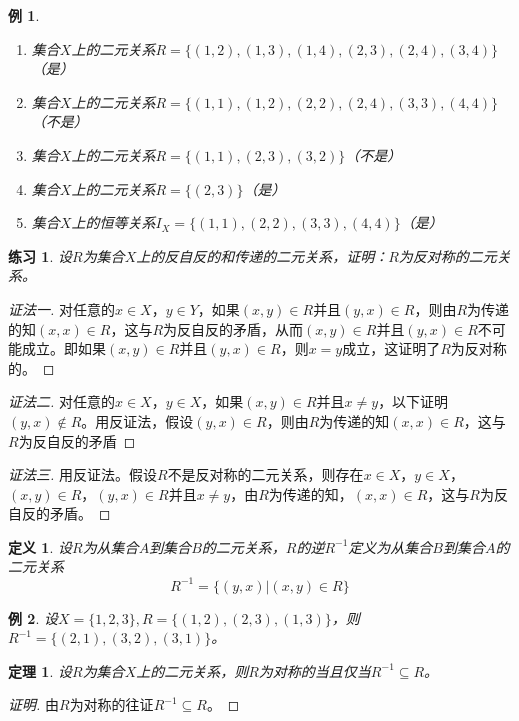 \documentclass{book}[oneside]
\newtheorem{Def}{定义}[chapter]
\newtheorem{Thm}{定理}[chapter]
\newtheorem{Exercise}{练习}[chapter]
\newtheorem{Example}{例}[chapter]
\begin{document}
\begin{CJK*}{UTF8}{gbsn}
\begin{Example}
  \begin{enumerate}
  \item 集合$X$上的二元关系$R=\{(1,2), (1,3), (1,4), (2,3),
    (2,4), (3,4)\}$（是）
  \item 集合$X$上的二元关系$R=\{(1,1), (1,2), (2,2),
    (2,4), (3,3), (4,4)\}$（不是）
  \item 集合$X$上的二元关系$R = \{(1,1), (2,3), (3,2)\}$（不是）
  \item 集合$X$上的二元关系$R = \{(2,3)\}$（是）
  \item 集合$X$上的恒等关系$I_X = \{(1,1), (2,2), (3,3),(4,4)\}$（是）
  \end{enumerate}
\end{Example}
\begin{Exercise}
  设$R$为集合$X$上的反自反的和传递的二元关系，证明：$R$为反对称的二元关系。  
  \end{Exercise}
  \begin{proof}[证法一]对任意的$x\in X$，$y\in Y$，如果$(x,y)\in R$并且$(y,x)\in R$，则由$R$为传递的知$(x,x)\in R$，这与$R$为反自反的矛盾，从而$(x,y)\in R$并且$(y,x)\in R$不可能成立。即如果$(x,y)\in R$并且$(y,x)\in R$，则$x=y$成立，这证明了$R$为反对称的。
    
  \end{proof}
  \begin{proof}[证法二]
   对任意的$x\in X$，$y\in X$，如果$(x,y)\in R$并且$x\neq y$，以下证明$(y,x)\notin R$。用反证法，假设$(y,x)\in R$，则由$R$为传递的知$(x,x)\in R$，这与$R$为反自反的矛盾 
  \end{proof}
  \begin{proof}[证法三]
    用反证法。假设$R$不是反对称的二元关系，则存在$x\in X$，$y\in X$，$(x,y)\in R$，$(y,x)\in R$并且$x\neq y$，由$R$为传递的知，$(x,x)\in R$，这与$R$为反自反的矛盾。
  \end{proof}

\begin{Def}
    设$R$为从集合$A$到集合$B$的二元关系，$R$的逆$R^{-1}$定义为从集合$B$到集合$A$的二元关系
    \[R^{-1}=\{(y,x)|(x,y)\in R\}\]
  \end{Def}
  \begin{Example}
    设$X=\{1,2,3\}, R=\{(1,2),(2,3),(1,3)\}$，则$R^{-1}=\{(2,1),(3,2),(3,1)\}$。
  \end{Example}

  \begin{Thm}
    设$R$为集合$X$上的二元关系，则$R$为对称的当且仅当$R^{-1}\subseteq R$。
  \end{Thm} 
\begin{proof}[证明]
由$R$为对称的往证$R^{-1}\subseteq R$。


\end{proof}
\end{CJK*}
\end{document}
